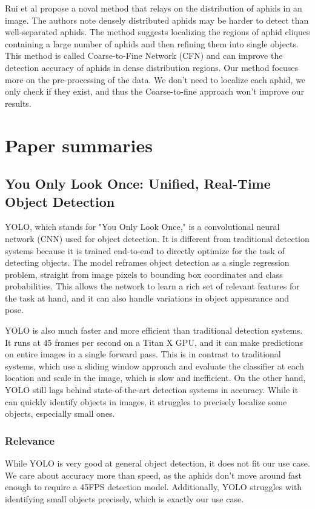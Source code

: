 \documentclass{article}
\begin{document}
Rui et al \cite{CoarseToFine} propose a noval method that relays on the distribution of aphids in an image. 
The authors note densely distributed aphids may be harder to detect than well-separated aphids. 
The method suggests localizing the regions of aphid cliques containing a large number of 
aphids and then refining them into single objects. This method is called 
Coarse-to-Fine Network (CFN) and can improve the detection accuracy of aphids in dense 
distribution regions. Our method focuses more on the pre-processing of the data. 
We don't need to localize each aphid, we only check if they exist, and thus the Coarse-to-fine 
approach won't improve our results.

\newpage
\section*{Paper summaries}

\subsection*{You Only Look Once: Unified, Real-Time Object Detection \cite{YOLO}}
YOLO, which stands for "You Only Look Once," is a convolutional neural network (CNN) used for object detection.
It is different from traditional detection systems because it is trained end-to-end to directly
optimize for the task of detecting objects.
The model reframes object detection as a single regression problem,
straight from image pixels to bounding box coordinates and class probabilities.
This allows the network to learn a rich set of relevant features for the task at hand,
and it can also handle variations in object appearance and pose.

YOLO is also much faster and more efficient than traditional detection systems.
It runs at 45 frames per second on a Titan X GPU, and it can make predictions on entire
images in a single forward pass. This is in contrast to traditional systems, which use a
sliding window approach and evaluate the classifier at each location and scale in the image,
which is slow and inefficient. On the other hand, YOLO still lags behind state-of-the-art detection
systems in accuracy. While it can quickly identify objects in images, it struggles to precisely
localize some objects, especially small ones.

\subsubsection*{Relevance}
While YOLO is very good at general object detection, it does not fit our use case.
We care about accuracy more than speed, as the aphids don't move around fast enough to require a 45FPS detection model.
Additionally, YOLO struggles with identifying small objects precisely, which is exactly our use case.
\end{document}
